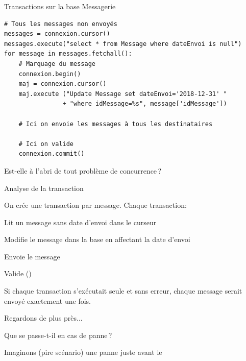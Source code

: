 

\begin{frame}[fragile]{Transactions sur la base Messagerie}

\begin{verbatim}
# Tous les messages non envoyés
messages = connexion.cursor()
messages.execute("select * from Message where dateEnvoi is null")
for message in messages.fetchall():
    # Marquage du message
    connexion.begin()
    maj = connexion.cursor()
    maj.execute ("Update Message set dateEnvoi='2018-12-31' "
                + "where idMessage=%s", message['idMessage'])
                
    # Ici on envoie les messages à tous les destinataires
               
    # Ici on valide
    connexion.commit()
\end{verbatim}

\vfill

\alert{Est-elle à l'abri de tout problème de concurrence\,?}
\end{frame}


\begin{frame}{Analyse de la transaction}

On crée une transaction par message. Chaque transaction:

\vfill

\begin{redbullet}
  \item Lit un message sans date d'envoi dans le curseur
   \item Modifie le message dans la base en affectant la date d'envoi
  \item Envoie le message
   \item Valide ()
\end{redbullet}

\vfill

\alert{Si chaque transaction s'exécutait seule et sans erreur,
chaque message serait envoyé exactement une fois.}

\vfill

Regardons de plus près...
\end{frame}

\begin{frame}{Que se passe-t-il en cas de panne\,?}

Imaginons (pire scénario) une panne \alert{juste avant} le 
\vfill

\vfill


\end{frame}

